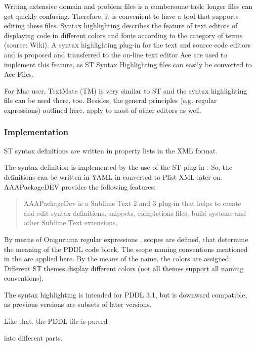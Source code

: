 \documentclass[11pt]{article}
\begin{document}
Writing extensive domain and problem files is a cumbersome task:
longer files can get quickly confusing. Therefore, it is convenient to
have a tool that supports editing these files. Syntax highlighting
describes the feature of text editors of displaying code in different
colors and fonts according to the category of terms (source: Wiki). A
syntax highlighting plug-in for the text and source code editors
\textcite{sublimetext2} and \textcite{sublimetext3} is proposed and
transferred to the on-line text editor Ace are used to implement this
feature, as ST Syntax Highlighting files can easily be converted to
Ace Files. 

For Mac user, TextMate (TM) is very similar to ST and the syntax
highlighting file can be used there, too. Besides, the general
principles (e.g. regular expressions) outlined here, apply to most of
other editors as well.  

\subsubsection{Implementation}
\label{sec-4-3-1}
ST syntax definitions are written in property lists in the XML format. 

The syntax definition is implemented by the use of the ST plug-in \textcite{aaapackagedev}. So, the definitions can be
written in YAML in converted to Plist XML later on. AAAPackageDEV provides the
following features:

\begin{quote}
AAAPackageDev is a Sublime Text 2 and 3 plug-in
that helps to create and edit syntax definitions, snippets,
completions files, build systems and other Sublime Text extensions.
\end{quote}

By means of Oniguruma regular expressions \parencite{kosako}, scopes are
defined, that determine the meaning of the PDDL code block. The scope naming
conventions mentioned in the  are applied here. By the means
of the name, the colors are assigned. Different ST themes
display different colors (not all themes support all naming conventions).

The syntax highlighting is intended for PDDL 3.1, but is downward
compatible, as previous versions are subsets of later versions.
\begin{center}
\end{center}
Like that, the PDDL file is parsed 
\begin{center}
\end{center}
into different parts. 
\end{document}
